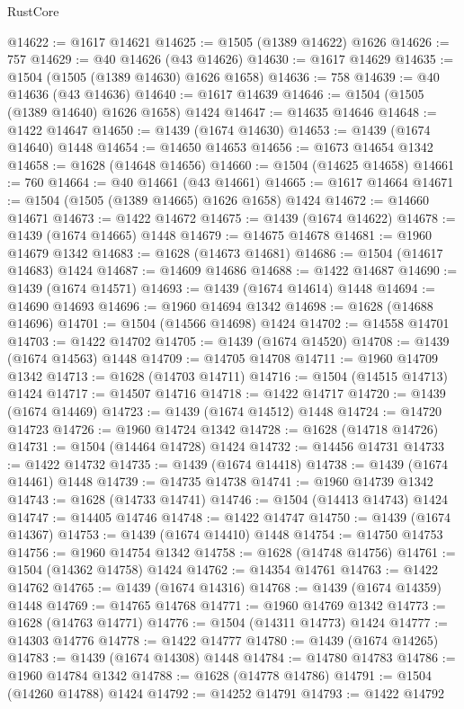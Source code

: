 \begin{lexlean}{RustCore}
\begin{coremodule}
@14622 := @1617 @14621
@14625 := @1505 (@1389 @14622) @1626
@14626 := 757
@14629 := @40 @14626 (@43 @14626)
@14630 := @1617 @14629
@14635 := @1504 (@1505 (@1389 @14630) @1626 @1658)
@14636 := 758
@14639 := @40 @14636 (@43 @14636)
@14640 := @1617 @14639
@14646 := @1504 (@1505 (@1389 @14640) @1626 @1658) @1424
@14647 := @14635 @14646
@14648 := @1422 @14647
@14650 := @1439 (@1674 @14630)
@14653 := @1439 (@1674 @14640) @1448
@14654 := @14650 @14653
@14656 := @1673 @14654 @1342
@14658 := @1628 (@14648 @14656)
@14660 := @1504 (@14625 @14658)
@14661 := 760
@14664 := @40 @14661 (@43 @14661)
@14665 := @1617 @14664
@14671 := @1504 (@1505 (@1389 @14665) @1626 @1658) @1424
@14672 := @14660 @14671
@14673 := @1422 @14672
@14675 := @1439 (@1674 @14622)
@14678 := @1439 (@1674 @14665) @1448
@14679 := @14675 @14678
@14681 := @1960 @14679 @1342
@14683 := @1628 (@14673 @14681)
@14686 := @1504 (@14617 @14683) @1424
@14687 := @14609 @14686
@14688 := @1422 @14687
@14690 := @1439 (@1674 @14571)
@14693 := @1439 (@1674 @14614) @1448
@14694 := @14690 @14693
@14696 := @1960 @14694 @1342
@14698 := @1628 (@14688 @14696)
@14701 := @1504 (@14566 @14698) @1424
@14702 := @14558 @14701
@14703 := @1422 @14702
@14705 := @1439 (@1674 @14520)
@14708 := @1439 (@1674 @14563) @1448
@14709 := @14705 @14708
@14711 := @1960 @14709 @1342
@14713 := @1628 (@14703 @14711)
@14716 := @1504 (@14515 @14713) @1424
@14717 := @14507 @14716
@14718 := @1422 @14717
@14720 := @1439 (@1674 @14469)
@14723 := @1439 (@1674 @14512) @1448
@14724 := @14720 @14723
@14726 := @1960 @14724 @1342
@14728 := @1628 (@14718 @14726)
@14731 := @1504 (@14464 @14728) @1424
@14732 := @14456 @14731
@14733 := @1422 @14732
@14735 := @1439 (@1674 @14418)
@14738 := @1439 (@1674 @14461) @1448
@14739 := @14735 @14738
@14741 := @1960 @14739 @1342
@14743 := @1628 (@14733 @14741)
@14746 := @1504 (@14413 @14743) @1424
@14747 := @14405 @14746
@14748 := @1422 @14747
@14750 := @1439 (@1674 @14367)
@14753 := @1439 (@1674 @14410) @1448
@14754 := @14750 @14753
@14756 := @1960 @14754 @1342
@14758 := @1628 (@14748 @14756)
@14761 := @1504 (@14362 @14758) @1424
@14762 := @14354 @14761
@14763 := @1422 @14762
@14765 := @1439 (@1674 @14316)
@14768 := @1439 (@1674 @14359) @1448
@14769 := @14765 @14768
@14771 := @1960 @14769 @1342
@14773 := @1628 (@14763 @14771)
@14776 := @1504 (@14311 @14773) @1424
@14777 := @14303 @14776
@14778 := @1422 @14777
@14780 := @1439 (@1674 @14265)
@14783 := @1439 (@1674 @14308) @1448
@14784 := @14780 @14783
@14786 := @1960 @14784 @1342
@14788 := @1628 (@14778 @14786)
@14791 := @1504 (@14260 @14788) @1424
@14792 := @14252 @14791
@14793 := @1422 @14792

\end{coremodule}
\end{lexlean}
